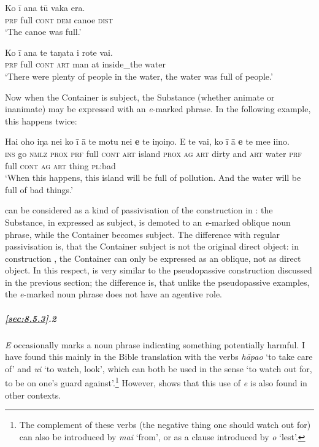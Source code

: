 \ea\label{ex:8.63}
\gll Ko {\ꞌ}ī {\ꞌ}ana tū vaka era. \\
\textsc{prf} full \textsc{cont} \textsc{dem} canoe \textsc{dist} \\

\glt 
‘The canoe was full.’ \textstyleExampleref{[R615.716]} 
\z

\ea\label{ex:8.64}
\gll Ko {\ꞌ}ī {\ꞌ}ana te taŋata {\ꞌ}i rote vai. \\
\textsc{prf} full \textsc{cont} \textsc{art} man at inside\_the water \\

\glt
‘There were plenty of people in the water, the water was full of people.’ \textstyleExampleref{[R210.166]} 
\z

Now when the Container is subject, the Substance (whether animate or inanimate) may be expressed with an \textit{e}{}-marked phrase. In the following example, this happens twice:

\ea\label{ex:8.65}
\gll Hai oho iŋa nei ko {\ꞌ}ī {\ꞌ}ā te motu nei \textbf{e} te iŋoiŋo. {\ꞌ}E te vai, ko {\ꞌ}ī {\ꞌ}ā \textbf{e} te me{\ꞌ}e {\ꞌ}i{\ꞌ}ino. \\
\textsc{ins} go \textsc{nmlz} \textsc{prox} \textsc{prf} full \textsc{cont} \textsc{art} island \textsc{prox} \textsc{ag} \textsc{art} dirty and \textsc{art} water \textsc{prf} full \textsc{cont} \textsc{ag} \textsc{art} thing \textsc{pl}:bad \\

\glt
‘When this happens, this island will be full of pollution. And the water will be full of bad things.’ \textstyleExampleref{[R649.119]} 
\z

 can be considered as a kind of passivisation of the construction in : the Substance, in  expressed as subject, is demoted to an \textit{e}{}-marked oblique noun phrase, while the Container becomes subject. The difference with regular passivisation is, that the Container subject is not the original direct object: in construction , the Container can only be expressed as an oblique, not as direct object. In this respect,  is very similar to the pseudopassive construction discussed in the previous section; the difference is, that unlike the pseudopassive examples, the \textit{e}{}-marked noun phrase does not have an agentive role.

\subparagraph{\ref{sec:8.5.3}.2} \textit{E} occasionally marks a noun phrase indicating something potentially harmful. I have found this mainly in the Bible translation with the verbs \textit{\mbox{hāpa{\ꞌ}o}} ‘to take care of’ and \textit{u{\ꞌ}i} ‘to watch, look’, which can both be used in the sense ‘to watch out for, to be on one’s guard against’.\footnote{\label{fn:418}The complement of these verbs (the negative thing one should watch out for) can also be introduced by \textit{mai} ‘from’, or as a clause introduced by \textit{{\ꞌ}o} ‘lest’.} However,  shows that this use of \textit{e} is also found in other contexts. 

